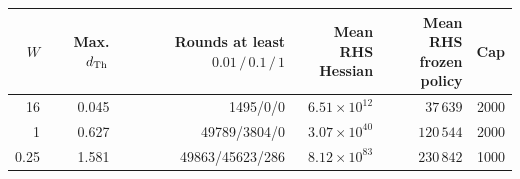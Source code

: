 \begin{tabular}{@{}rrrrrr@{}}
\toprule
$W$ & \shortstack{Max.\\$d_{\rm Th}$} & \shortstack{Rounds at least\\$0.01\,/\,0.1\,/\,1$} & \shortstack{Mean RHS\\Hessian} & \shortstack{Mean RHS\\frozen policy} & Cap \\
\midrule
16 & 0.045 & 1495/0/0 & $6.51\times10^{12}$ & $37\,639$ & 2000 \\
1 & 0.627 & 49789/3804/0 & $3.07\times10^{40}$ & $120\,544$ & 2000 \\
0.25 & 1.581 & 49863/45623/286 & $8.12\times10^{83}$ & $230\,842$ & 1000 \\
\bottomrule
\end{tabular}
